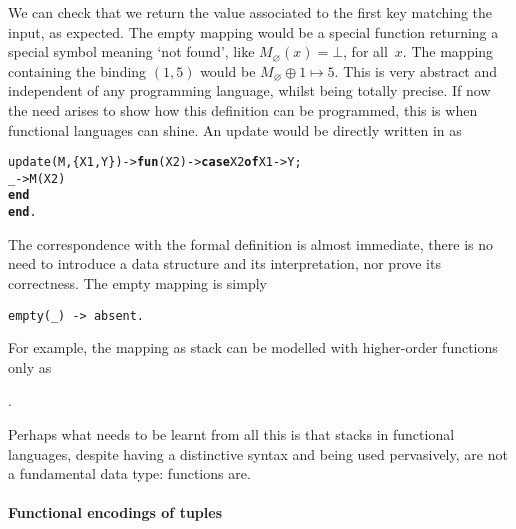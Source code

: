 We can check that we return the value associated to the first key
matching the input, as expected. The empty mapping would be a special
function returning a special symbol meaning `not found', like
\(M_\varnothing(x) = \bot\), for all~\(x\). The mapping containing the
binding \((1,5)\) would be \(M_\varnothing \mathrel{\oplus} 1 \mapsto
5\). This is very abstract and independent of any programming
language, whilst being totally precise. If now the need arises to show
how this definition can be programmed, this is when functional
languages can shine. An update would be directly written in \Erlang as
\begin{alltt}
update(M,\{X1,Y\}) -> \textbf{fun}(X2) -> \textbf{case} X2 \textbf{of} X1 -> Y;
                                           \_ -> M(X2)
                               \textbf{end}
                    \textbf{end}.
\end{alltt}
The correspondence with the formal definition is almost immediate,
there is no need to introduce a data structure and its interpretation,
nor prove its correctness. The empty mapping is simply
\begin{verbatim}
empty(_) -> absent.
\end{verbatim}
For example, the mapping as stack \erlcode{[\{a,0\},\{b,1\},\{a,5\}]}
can be modelled with higher\hyp{}order functions only as
\begin{center}
.
\end{center}
Perhaps what needs to be learnt from all this is that stacks in
functional languages, despite having a distinctive syntax and being
used pervasively, are not a fundamental data type: functions are.

\paragraph{Functional encodings of tuples}


